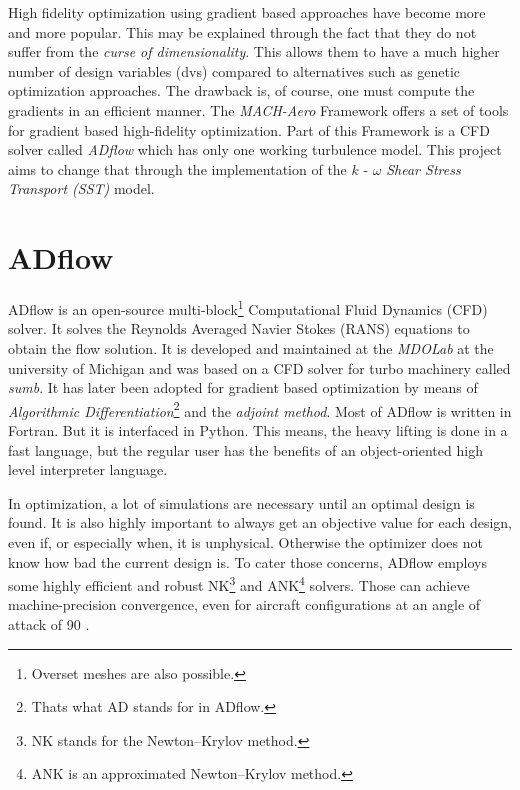High fidelity optimization using gradient based approaches have become more and
more popular. This may be explained through the fact that they do not suffer
from the \textit{curse of dimensionality}. This allows them to have a much
higher number of design variables (dvs) compared to alternatives such as genetic
optimization approaches. The drawback is, of course, one must compute the
gradients in an efficient manner. The \textit{MACH-Aero} Framework offers a set
of tools for gradient based high-fidelity optimization. Part of this Framework
is a CFD solver called \textit{ADflow} which has only one working turbulence
model. This project aims to change that through the implementation of the $k$ -
$\omega$ \textit{Shear Stress Transport (SST)} model.








\section{ADflow}
ADflow is an open-source multi-block\footnote{Overset meshes are also
possible.} Computational Fluid Dynamics (CFD) solver. It solves the Reynolds
Averaged Navier Stokes (RANS) equations to obtain the flow solution. It is
developed and maintained at the \textit{MDOLab} at the university of Michigan
and was based on a CFD solver for turbo machinery called \textit{sumb}. It has
later been adopted  for gradient based optimization by means of
\textit{Algorithmic Differentiation}\footnote{Thats what AD stands for in
ADflow.} and the \textit{adjoint method}. Most of ADflow is written in Fortran.
But it is interfaced in Python. This means, the heavy lifting is done in a fast
language, but the regular user has the benefits of an object-oriented high
level interpreter language.
 
In optimization, a lot of simulations are necessary until an optimal design is
found. It is also highly important to always get an objective value for each
design, even if, or especially when, it is unphysical. Otherwise the optimizer
does not know how bad the current design is. To cater those concerns, ADflow
employs some highly efficient and robust NK\footnote{NK stands for the
Newton–Krylov method.} and ANK\footnote{ANK is an approximated Newton–Krylov
method.} solvers. Those can achieve machine-precision convergence, even for
aircraft configurations at an angle of attack of 90\degree \cite{Mader2020a}
\cite{Kenway2019a} \cite{Yildirim2019b}.

